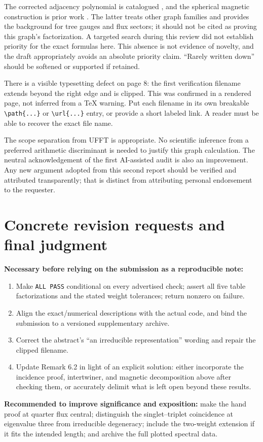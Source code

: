 \documentclass[11pt,a4paper]{article}
\begin{document}
The corrected adjacency polynomial is catalogued \cite{mw}, and the spherical magnetic construction is prior work \cite{al}. The latter treats other graph families and provides the background for tree gauges and flux sectors; it should not be cited as proving this graph's factorization. A targeted search during this review did not establish priority for the exact formulas here. This absence is not evidence of novelty, and the draft appropriately avoids an absolute priority claim. ``Rarely written down'' should be softened or supported if retained.

There is a visible typesetting defect on page 8: the first verification filename extends beyond the right edge and is clipped. This was confirmed in a rendered page, not inferred from a TeX warning. Put each filename in its own breakable \verb|\path{...}| or \verb|\url{...}| entry, or provide a short labeled link. A reader must be able to recover the exact file name.

The scope separation from UFFT is appropriate. No scientific inference from a preferred arithmetic discriminant is needed to justify this graph calculation. The neutral acknowledgement of the first AI-assisted audit is also an improvement. Any new argument adopted from this second report should be verified and attributed transparently; that is distinct from attributing personal endorsement to the requester.

\section{Concrete revision requests and final judgment}
\textbf{Necessary before relying on the submission as a reproducible note:}
\begin{enumerate}
\item Make \texttt{ALL PASS} conditional on every advertised check; assert all five table factorizations and the stated weight tolerances; return nonzero on failure.
\item Align the exact/numerical descriptions with the actual code, and bind the submission to a versioned supplementary archive.
\item Correct the abstract's ``an irreducible representation'' wording and repair the clipped filename.
\item Update Remark 6.2 in light of an explicit solution: either incorporate the incidence proof, intertwiner, and magnetic decomposition above after checking them, or accurately delimit what is left open beyond these results.
\end{enumerate}
\textbf{Recommended to improve significance and exposition:} make the hand proof at quarter flux central; distinguish the singlet--triplet coincidence at eigenvalue three from irreducible degeneracy; include the two-weight extension if it fits the intended length; and archive the full plotted spectral data.
\end{document}
